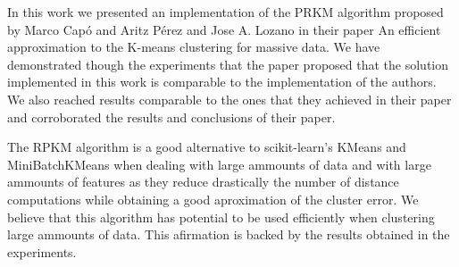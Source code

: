 In this work we presented an implementation of the PRKM algorithm proposed by Marco Capó and Aritz Pérez and Jose A. Lozano in their paper \cite{CAPO201756} An efficient approximation to the K-means clustering for massive data. We have demonstrated though the experiments that the paper proposed that the solution implemented in this work is comparable to the implementation of the authors. We also reached results comparable to the ones that they achieved in their paper and corroborated the results and conclusions of their paper.

The RPKM algorithm is a good alternative to scikit-learn's KMeans and MiniBatchKMeans when dealing with large ammounts of data and with large ammounts of features as they reduce drastically the number of distance computations while obtaining a good aproximation of the cluster error. We believe that this algorithm has potential to be used efficiently when clustering large ammounts of data. This afirmation is backed by the results obtained in the experiments.